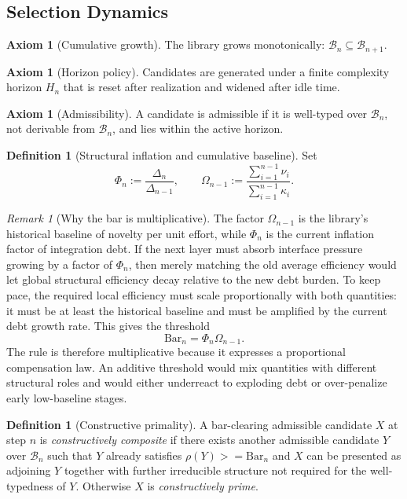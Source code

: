 \documentclass[11pt,a4paper]{article}
\def\geq{>=}%
\theoremstyle{plain}
\theoremstyle{definition}
\newtheorem{definition}[theorem]{Definition}
\newtheorem{axiom}[theorem]{Axiom}
\theoremstyle{remark}
\newtheorem{remark}[theorem]{Remark}
\newcommand{\B}{\mathcal{B}}
\newcommand{\SelBar}{\mathrm{Bar}}
\begin{document}
\subsection{Selection Dynamics}

\begin{axiom}[Cumulative growth]
\label{ax:cumulative}
The library grows monotonically: $\B_n\subseteq \B_{n+1}$.
\end{axiom}

\begin{axiom}[Horizon policy]
\label{ax:horizon}
Candidates are generated under a finite complexity horizon $H_n$ that is reset after realization and widened after idle time.
\end{axiom}

\begin{axiom}[Admissibility]
\label{ax:admissibility}
A candidate is admissible if it is well-typed over $\B_n$, not derivable from $\B_n$, and lies within the active horizon.
\end{axiom}

\begin{definition}[Structural inflation and cumulative baseline]
\label{def:bar}
Set
\[
  \Phi_n:=\frac{\Delta_n}{\Delta_{n-1}},
  \qquad
  \Omega_{n-1}:=\frac{\sum_{i=1}^{n-1}\nu_i}{\sum_{i=1}^{n-1}\kappa_i}.
\]
\end{definition}

\begin{remark}[Why the bar is multiplicative]
\label{rem:bar-motivation}
The factor $\Omega_{n-1}$ is the library's historical baseline of novelty per unit effort, while $\Phi_n$ is the current inflation factor of integration debt.  If the next layer must absorb interface pressure growing by a factor of $\Phi_n$, then merely matching the old average efficiency would let global structural efficiency decay relative to the new debt burden.  To keep pace, the required local efficiency must scale proportionally with both quantities: it must be at least the historical baseline and must be amplified by the current debt growth rate.  This gives the threshold
\[
  \SelBar_n=\Phi_n\Omega_{n-1}.
\]
The rule is therefore multiplicative because it expresses a proportional compensation law.  An additive threshold would mix quantities with different structural roles and would either underreact to exploding debt or over-penalize early low-baseline stages.
\end{remark}

\begin{definition}[Constructive primality]
\label{def:primality}
A bar-clearing admissible candidate $X$ at step $n$ is \emph{constructively composite} if there exists another admissible candidate $Y$ over $\B_n$ such that $Y$ already satisfies $\rho(Y)\geq \SelBar_n$ and $X$ can be presented as adjoining $Y$ together with further irreducible structure not required for the well-typedness of $Y$.  Otherwise $X$ is \emph{constructively prime}.
\end{definition}
\end{document}
